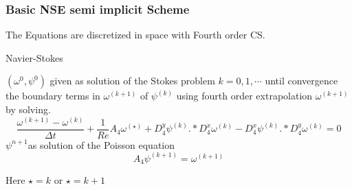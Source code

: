 \documentclass[hyperref={pdfpagemode=FullScreen},9pt]{beamer}
\newcommand{\Frac}[2] {\frac{\textstyle #1} {\textstyle #2}}
\begin{document}
 \begin{frame}
 \frametitle{Basic NSE semi implicit Scheme}
 The Equations are discretized in space with Fourth order CS.
  \begin{center}
\begin{minipage}[H]{12cm}
  \begin{algorithm}[H]
    \caption{Navier-Stokes}\label{NSE}
    \begin{algorithmic}[1]
        \State  $(\omega^0, \psi^0)$ given as solution of the Stokes problem 
            \For $k=0,1, \cdots$ until convergence
               the boundary terms in $\omega^{(k+1)}$ of $\psi^{(k)}$ using  fourth order extrapolation %
                $\omega^{(k+1)}$ by solving. 
              $$ 
              \Frac{\omega^{(k+1)}-\omega^{(k)}}{\Delta t}+\Frac{1}{Re}A_4\omega^{(\star)}
              +D_4^y\psi^{(k)}.*D_4^x\omega^{(k)} - D_4^x\psi^{(k)}.*D_4^y\omega^{(k)}=0         
              $$
                $\psi^{n+1}$as solution of the  Poisson equation %
               $$
               A_4\psi^{(k+1)}=\omega^{(k+1)}
               $$     
            \EndFor
    \end{algorithmic}
    \end{algorithm}
\end{minipage}
\end{center}
 Here $\star=k$ or $\star=k+1$
 \end{frame}
\end{document}
